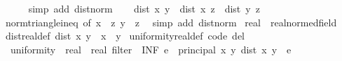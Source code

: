\begin{isabellebody}
\ \ \ \ \isamarkupfalse%
\ {\isacharparenleft}{\kern0pt}simp\ add{\isacharcolon}{\kern0pt}\ dist{\isacharunderscore}{\kern0pt}norm{\isacharparenright}{\kern0pt}\isanewline
\ \ \isamarkupfalse%
\ {\isachardoublequoteopen}dist\ x\ y\ {\isasymle}\ dist\ x\ z\ {\isacharplus}{\kern0pt}\ dist\ y\ z{\isachardoublequoteclose}\isanewline
\ \ \ \ \isamarkupfalse%
\ norm{\isacharunderscore}{\kern0pt}triangle{\isacharunderscore}{\kern0pt}ineq{}\ {\isacharbrackleft}{\kern0pt}of\ {\isachardoublequoteopen}x\ {\isacharminus}{\kern0pt}\ z{\isachardoublequoteclose}\ {\isachardoublequoteopen}y\ {\isacharminus}{\kern0pt}\ z{\isachardoublequoteclose}{\isacharbrackright}{\kern0pt}\ \isamarkupfalse%
\ {\isacharparenleft}{\kern0pt}simp\ add{\isacharcolon}{\kern0pt}\ dist{\isacharunderscore}{\kern0pt}norm{\isacharparenright}{\kern0pt}\isanewline
{}\isamarkupfalse%
%
\endisatagproof
{\isafoldproof}%
%
\isadelimproof
%
\endisadelimproof
%
\isadelimdocument
%
\endisadelimdocument
%
\isatagdocument
%
\isamarkuptrue%
%
\endisatagdocument
{\isafolddocument}%
%
\isadelimdocument
%
\endisadelimdocument
{}\isamarkupfalse%
\ real\ {\isacharcolon}{\kern0pt}{\isacharcolon}{\kern0pt}\ real{\isacharunderscore}{\kern0pt}normed{\isacharunderscore}{\kern0pt}field\isanewline
{}\isanewline
\isanewline
{}\isamarkupfalse%
\ dist{\isacharunderscore}{\kern0pt}real{\isacharunderscore}{\kern0pt}def{\isacharcolon}{\kern0pt}\ {\isachardoublequoteopen}dist\ x\ y\ {\isacharequal}{\kern0pt}\ {\isasymbar}x\ {\isacharminus}{\kern0pt}\ y{\isasymbar}{\isachardoublequoteclose}\isanewline
\isanewline
{}\isamarkupfalse%
\ uniformity{\isacharunderscore}{\kern0pt}real{\isacharunderscore}{\kern0pt}def\ {\isacharbrackleft}{\kern0pt}code\ del{\isacharbrackright}{\kern0pt}{\isacharcolon}{\kern0pt}\isanewline
\ \ {\isachardoublequoteopen}{\isacharparenleft}{\kern0pt}uniformity\ {\isacharcolon}{\kern0pt}{\isacharcolon}{\kern0pt}\ {\isacharparenleft}{\kern0pt}real\ {\isasymtimes}\ real{\isacharparenright}{\kern0pt}\ filter{\isacharparenright}{\kern0pt}\ {\isacharequal}{\kern0pt}\ {\isacharparenleft}{\kern0pt}INF\ e{\isasymin}{\isacharbraceleft}{\kern0pt}{}\ {\isacharless}{\kern0pt}{\isachardot}{\kern0pt}{\isachardot}{\kern0pt}{\isacharbraceright}{\kern0pt}{\isachardot}{\kern0pt}\ principal\ {\isacharbraceleft}{\kern0pt}{\isacharparenleft}{\kern0pt}x{\isacharcomma}{\kern0pt}\ y{\isacharparenright}{\kern0pt}{\isachardot}{\kern0pt}\ dist\ x\ y\ {\isacharless}{\kern0pt}\ e{\isacharbraceright}{\kern0pt}{\isacharparenright}{\kern0pt}{\isachardoublequoteclose}\isanewline

\end{isabellebody}
